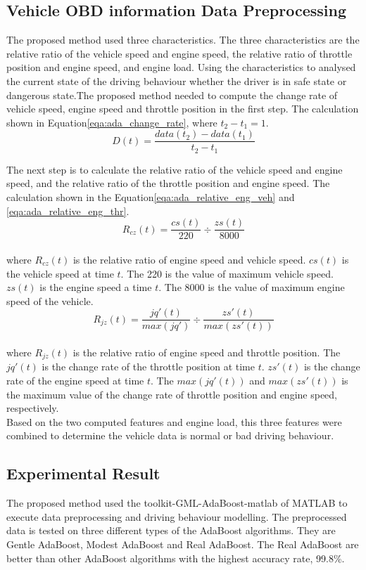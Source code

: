 \subsection{Vehicle OBD information Data Preprocessing}
The proposed method used three characteristics. The three characteristics are the relative ratio of the vehicle speed and engine speed, the relative ratio of throttle position and engine speed, and engine load. Using the characteristics to analysed the current state of the driving behaviour whether the driver is in safe state or dangerous state.The proposed method needed to compute the change rate of vehicle speed, engine speed and throttle position in the first step. The calculation shown in Equation\eqref{eqa:ada_change_rate}, where $t_{2} - t_{1} = 1$.\\
\begin{equation}
\label{eqa:ada_change_rate}
D(t) = \dfrac{data(t_{2})-data(t_{1})}{t_{2}-t_{1}}
\end{equation}

The next step is to calculate the relative ratio of the vehicle speed and engine speed, and the relative ratio of the throttle position and engine speed. The calculation shown in the Equation\eqref{eqa:ada_relative_eng_veh} and \eqref{eqa:ada_relative_eng_thr}. \\
\begin{equation}
\label{eqa:ada_relative_eng_veh}
R_{cz}(t) = \dfrac{cs(t)}{220} \div \dfrac{zs(t)}{8000}
\end{equation}
\\
where $R_{cz}(t)$ is the relative ratio of engine speed and vehicle speed. $cs(t)$ is the vehicle speed at time $t$. The 220 is the value of maximum vehicle speed. $zs(t)$ is the engine speed a time $t$. The 8000 is the value of maximum engine speed of the vehicle.\\

\begin{equation}
\label{eqa:ada_relative_eng_thr}
R_{jz}(t) = \dfrac{jq'(t)}{max(jq')} \div \dfrac{zs'(t)}{max(zs'(t))}
\end{equation}
\\
where $R_{jz}(t)$ is the relative ratio of engine speed and throttle position. The $jq'(t)$ is the change rate of the throttle position at time $t$. $zs'(t)$ is the change rate of the engine speed at time $t$. The $max(jq'(t))$ and $max(zs'(t))$ is the maximum value of the change rate of throttle position and engine speed, respectively.\\

Based on the two computed features and engine load, this three features were combined to determine the vehicle data is normal or bad driving behaviour.

\subsection{Experimental Result}
The proposed method used the toolkit-GML-AdaBoost-matlab of MATLAB to execute data preprocessing and driving behaviour modelling. The preprocessed data is tested on three different types of the AdaBoost algorithms. They are Gentle AdaBoost, Modest AdaBoost and Real AdaBoost. The Real AdaBoost are better than other AdaBoost algorithms with the highest accuracy rate, 99.8\%.